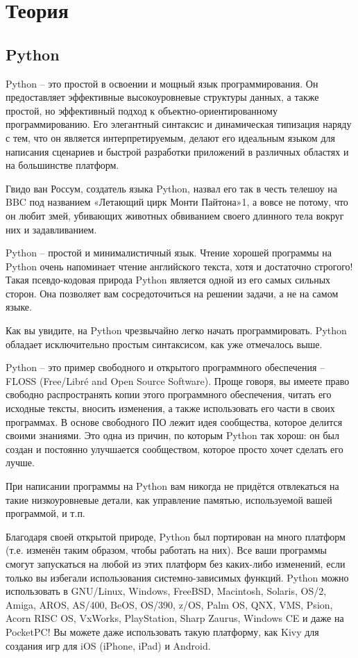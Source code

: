 \documentclass[11pt,a4paper]{report}
\begin{document}
\tableofcontents
\newpage
\section{Теория}
\subsection{Python}

Python – это простой в освоении и мощный язык программирования. Он предоставляет эффективные высокоуровневые структуры данных, а также простой, но эффективный подход к объектно-ориентированному программированию. Его элегантный синтаксис и динамическая типизация наряду с тем, что он является интерпретируемым, делают его идеальным языком для написания сценариев и быстрой разработки приложений в различных областях и на большинстве платформ.

Гвидо ван Россум, создатель языка Python, назвал его так в честь телешоу на BBC под названием «Летающий цирк Монти Пайтона»1, а вовсе не потому, что он любит змей, убивающих животных обвиванием своего длинного тела вокруг них и задавливанием.

Python – простой и минималистичный язык. Чтение хорошей программы на Python очень напоминает чтение английского текста, хотя и достаточно строгого! Такая псевдо-кодовая природа Python является одной из его самых сильных сторон. Она позволяет вам сосредоточиться на решении задачи, а не на самом языке.

Как вы увидите, на Python чрезвычайно легко начать программировать. Python обладает исключительно простым синтаксисом, как уже отмечалось выше.

Python – это пример свободного и открытого программного обеспечения –FLOSS (Free/Libré and Open Source Software). Проще говоря, вы имеете право свободно распространять копии этого программного обеспечения, читать его исходные тексты, вносить изменения, а также использовать его части в своих программах. В основе свободного ПО лежит идея сообщества, которое делится своими знаниями. Это одна из причин, по которым Python так хорош: он был создан и постоянно улучшается сообществом, которое просто хочет сделать его лучше.

При написании программы на Python вам никогда не придётся отвлекаться на такие низкоуровневые детали, как управление памятью, используемой вашей программой, и т.п.

Благодаря своей открытой природе, Python был портирован на много платформ (т.е. изменён таким образом, чтобы работать на них). Все ваши программы смогут запускаться на любой из этих платформ без каких-либо изменений, если только вы избегали использования системно-зависимых функций. Python можно использовать в GNU/Linux, Windows, FreeBSD, Macintosh, Solaris, OS/2, Amiga, AROS, AS/400, BeOS, OS/390, z/OS, Palm OS, QNX, VMS, Psion, Acorn RISC OS, VxWorks, PlayStation, Sharp Zaurus, Windows CE и даже на PocketPC! Вы можете даже использовать такую платформу, как Kivy для создания игр для iOS (iPhone, iPad) и Android.
\end{document}
